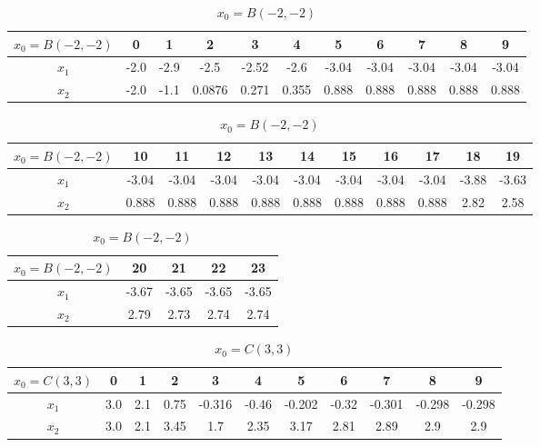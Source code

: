 \begin{table}[H]
\centering
\setlength{\abovecaptionskip}{0cm} 
\setlength{\belowcaptionskip}{-0.5cm} 
\scriptsize
\begin{tabular}{|c|c|c|c|c|c|c|c|c|c|c|}
\hline
$x_0=B(-2,-2)$&0&1&2&3&4&5&6&7&8&9\\
\hline
$x_1$&-2.0 & -2.9 & -2.5 & -2.52 & -2.6 & -3.04 & -3.04 & -3.04 & -3.04 & -3.04 \\
\hline
$x_2$&-2.0 & -1.1 & 0.0876 & 0.271 & 0.355 & 0.888 & 0.888 & 0.888 & 0.888 & 0.888 
\\
\hline
\end{tabular}

\begin{tabular}{|c|c|c|c|c|c|c|c|c|c|c|}
\hline
$x_0=B(-2,-2)$&10&11&12&13&14&15&16&17&18&19\\
\hline
$x_1$&-3.04 & -3.04 & -3.04 & -3.04 & -3.04 & -3.04 & -3.04 & -3.04 & -3.88 & -3.63  \\
\hline
$x_2$&0.888 & 0.888 & 0.888 & 0.888 & 0.888 & 0.888 & 0.888 & 0.888 & 2.82 & 2.58
\\
\hline
\end{tabular}
\begin{tabular}{|c|c|c|c|c|}
\hline
$x_0=B(-2,-2)$&20&21&22&23\\
\hline
$x_1$ &-3.67 & -3.65 & -3.65 & -3.65\\
\hline
$x_2$&  2.79 & 2.73 & 2.74 & 2.74\\
\hline

\end{tabular}
\caption{$x_0=B(-2,-2)$}
\end{table}
\begin{table}[H]
\centering
\setlength{\abovecaptionskip}{0cm} 
\setlength{\belowcaptionskip}{-0.5cm} 
\scriptsize
\begin{tabular}{|c|c|c|c|c|c|c|c|c|c|c|}
\hline
$x_0=C(3,3)$&0&1&2&3&4&5&6&7&8&9\\
\hline
$x_1$&3.0 & 2.1 & 0.75 & -0.316 & -0.46 & -0.202 & -0.32 & -0.301 & -0.298 & -0.298 \\
\hline
$x_2$&3.0 & 2.1 & 3.45 & 1.7 & 2.35 & 3.17 & 2.81 & 2.89 & 2.9 & 2.9
\\
\hline
\end{tabular}

\caption{$x_0=C(3,3)$}
\end{table}
